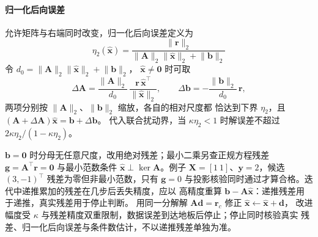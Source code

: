 \paragraph{归一化后向误差}

允许矩阵与右端同时改变，归一化后向误差定义为
\begin{equation}
 \eta_2(\widehat{\bm x})
 =\frac{\lVert\bm r\rVert_2}
       {\lVert\bm A\rVert_2\lVert\widehat{\bm x}\rVert_2+\lVert\bm b\rVert_2}
 \label{def:matrix-analysis-normwise-backward-error}
\end{equation}
令 $d_0=\lVert\bm A\rVert_2\lVert\widehat{\bm x}\rVert_2+\lVert\bm b\rVert_2$，
$\widehat{\bm x}\neq\bm0$ 时可取
\[
 \Delta\bm A=\frac{\lVert\bm A\rVert_2}{d_0}\,
 \frac{\bm r\,\widehat{\bm x}^\top}{\lVert\widehat{\bm x}\rVert_2},
 \qquad
 \Delta\bm b=-\frac{\lVert\bm b\rVert_2}{d_0}\,\bm r,
\]
两项分别按 $\lVert\bm A\rVert_2$、$\lVert\bm b\rVert_2$ 缩放，各自的相对尺度都
恰达到下界 $\eta_2$，且 $(\bm A+\Delta\bm A)\widehat{\bm x}=\bm b+\Delta\bm b$。
代入联合扰动界，当 $\kappa\eta_2<1$ 时解误差不超过 $2\kappa\eta_2/(1-\kappa\eta_2)$。

$\bm b=\bm0$ 时分母无任意尺度，改用绝对残差；最小二乘另查正规方程残差
$\bm g=\bm A^\top\bm r=\bm0$ 与最小范数条件 $\widehat{\bm x}\perp\ker\bm A$。例子
$\bm X=[1\ 1]$、$\bm y=2$，候选 $(3,-1)^\top$ 残差为零但非最小范数，只有
$\bm g=0$ 与投影核验同时通过才算合格。迭代中递推累加的残差在几步后丢失精度，应以
高精度重算 $\bm b-\bm A\widehat{\bm x}$：递推残差用于递推，真实残差用于停止判断。
用同一分解解 $\bm A\bm d=\bm r_c$ 修正 $\widehat{\bm x}\leftarrow\widehat{\bm x}+\bm d$，
改进幅度受 $\kappa$ 与残差精度双重限制，数据误差到达地板后停止；停止同时核验真实
残差、归一化后向误差与条件数估计，不以递推残差单独为准。

